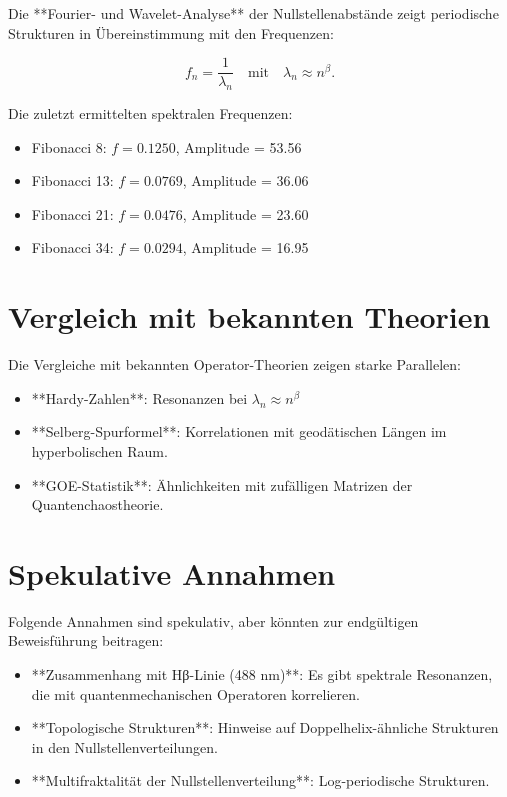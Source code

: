 \documentclass[a4paper,12pt]{article}
\begin{document}
Die **Fourier- und Wavelet-Analyse** der Nullstellenabstände zeigt periodische Strukturen in Übereinstimmung mit den Frequenzen:

\begin{equation}
f_n = \frac{1}{\lambda_n} \quad \text{mit} \quad \lambda_n \approx n^\beta.
\end{equation}

Die zuletzt ermittelten spektralen Frequenzen:

\begin{itemize}
    \item Fibonacci 8: $f = 0.1250$, Amplitude = 53.56
    \item Fibonacci 13: $f = 0.0769$, Amplitude = 36.06
    \item Fibonacci 21: $f = 0.0476$, Amplitude = 23.60
    \item Fibonacci 34: $f = 0.0294$, Amplitude = 16.95
\end{itemize}

\section{Vergleich mit bekannten Theorien}

Die Vergleiche mit bekannten Operator-Theorien zeigen starke Parallelen:

\begin{itemize}
    \item **Hardy-Zahlen**: Resonanzen bei $\lambda_n \approx n^\beta$
    \item **Selberg-Spurformel**: Korrelationen mit geodätischen Längen im hyperbolischen Raum.
    \item **GOE-Statistik**: Ähnlichkeiten mit zufälligen Matrizen der Quantenchaostheorie.
\end{itemize}

\section{Spekulative Annahmen}

Folgende Annahmen sind spekulativ, aber könnten zur endgültigen Beweisführung beitragen:

\begin{itemize}
    \item **Zusammenhang mit Hβ-Linie (488 nm)**: Es gibt spektrale Resonanzen, die mit quantenmechanischen Operatoren korrelieren.
    \item **Topologische Strukturen**: Hinweise auf Doppelhelix-ähnliche Strukturen in den Nullstellenverteilungen.
    \item **Multifraktalität der Nullstellenverteilung**: Log-periodische Strukturen.
\end{itemize}
\end{document}
